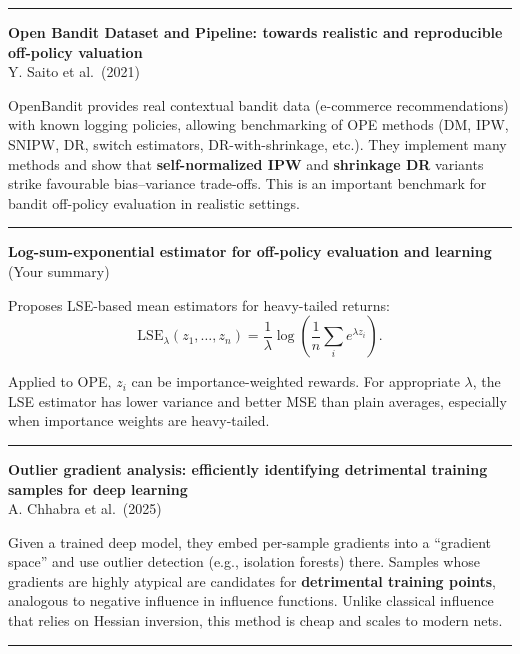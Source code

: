 \documentclass[a5paper]{article}
\begin{document}
\begin{center}\rule{0.5\linewidth}{0.5pt}\end{center}

\textbf{Open Bandit Dataset and Pipeline: towards realistic and
reproducible off-policy valuation}\\
Y. Saito et al.~(2021)

OpenBandit provides real contextual bandit data (e-commerce
recommendations) with known logging policies, allowing benchmarking of
OPE methods (DM, IPW, SNIPW, DR, switch estimators, DR-with-shrinkage,
etc.). They implement many methods and show that \textbf{self-normalized
IPW} and \textbf{shrinkage DR} variants strike favourable bias--variance
trade-offs. This is an important benchmark for bandit off-policy
evaluation in realistic settings.

\begin{center}\rule{0.5\linewidth}{0.5pt}\end{center}

\textbf{Log-sum-exponential estimator for off-policy evaluation and
learning}\\
(Your summary)

Proposes LSE-based mean estimators for heavy-tailed returns:
\[ \mathrm{LSE}_\lambda(z_1,\dots,z_n) =
\frac1\lambda \log\left(\frac1n\sum_i e^{\lambda z_i}\right). \]

Applied to OPE, $z_i$ can be importance-weighted rewards. For appropriate
$\lambda$, the LSE estimator has lower variance and better MSE than plain
averages, especially when importance weights are heavy-tailed.

\begin{center}\rule{0.5\linewidth}{0.5pt}\end{center}

\textbf{Outlier gradient analysis: efficiently identifying detrimental
training samples for deep learning}\\
A. Chhabra et al.~(2025)

Given a trained deep model, they embed per-sample gradients into a
``gradient space'' and use outlier detection (e.g., isolation forests)
there. Samples whose gradients are highly atypical are candidates for
\textbf{detrimental training points}, analogous to negative influence in
influence functions. Unlike classical influence that relies on Hessian
inversion, this method is cheap and scales to modern nets.

\begin{center}\rule{0.5\linewidth}{0.5pt}\end{center}
\end{document}
